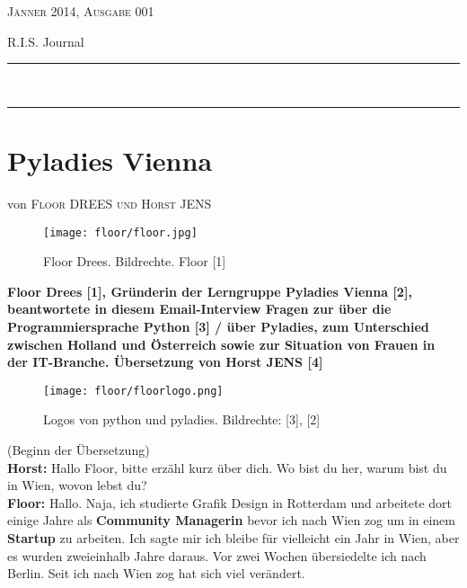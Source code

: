\documentclass[10pt,a4paper,ngerman,twoside]{article} %
\newcommand{\HorRule}[1]{\noindent\rule{\linewidth}{#1}} %
\newcommand{\NewsletterName}[1]{ %
\begin{center}
\Huge \usefont{T1}{fvs}{b}{n} %
#1
\end{center}	
\par \normalsize \normalfont}
\newcommand{\JournalIssue}[1]{ %
\hfill \textsc{Jänner 2014, Ausgabe 001}
\par \normalsize \normalfont}
\newcommand{\NewsItem}[1]{ %
\usefont{T1}{fvs}{n}{n} %
\vspace{24pt}\large #1\vspace{3pt} %
\par \normalsize \normalfont}
\newcommand{\NewsAuthor}[1]{ %
\hfill von \textsc{#1} \vspace{20pt} %
\par \normalfont}
\begin{document}
\JournalIssue{1} %
\NewsletterName{R.I.S. Journal} %
\noindent\HorRule{3pt} \\[-0.75\baselineskip] %
\HorRule{1pt} %




%

\NewsItem{}
\section*{Pyladies Vienna}
\label{floor}
\NewsAuthor{Floor DREES und Horst JENS}
\begin{figure}
\texttt{[image: floor/floor.jpg]} \\
\caption{Floor Drees. Bildrechte. Floor [1]}
\end{figure}
\textbf{Floor Drees [1], Gründerin der Lerngruppe Pyladies Vienna [2], beantwortete in diesem Email-Interview Fragen zur über die Programmiersprache Python [3] / über Pyladies, zum Unterschied zwischen Holland und Österreich sowie zur Situation von Frauen in der IT-Branche. Übersetzung von Horst JENS [4]} \\
\begin{figure}
\texttt{[image: floor/floorlogo.png]} \\
\caption{Logos von python und pyladies. Bildrechte: [3], [2]}
\end{figure}

(Beginn der Übersetzung) \\
\textbf{Horst:} Hallo Floor, bitte erzähl kurz über dich. Wo bist du her, warum bist du in Wien, wovon lebst du? \\
\textbf{Floor:} Hallo. Naja, ich studierte Grafik Design in Rotterdam und arbeitete dort einige Jahre als \textbf{Community Managerin} bevor ich nach Wien zog um in einem \textbf{Startup} zu arbeiten.  Ich sagte mir ich bleibe für vielleicht ein Jahr in Wien, aber es wurden zweieinhalb Jahre daraus. Vor zwei Wochen übersiedelte ich nach Berlin. Seit ich nach Wien zog hat sich viel verändert. 
\end{document}
